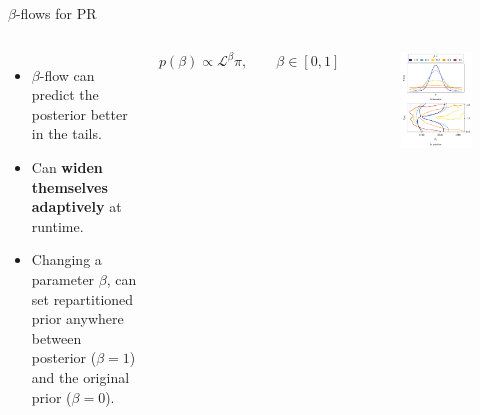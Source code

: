\documentclass[aspectratio=169]{beamer}
\begin{document}
\begin{frame}{$\beta$-flows for PR}
\begin{columns}
    \begin{itemize}
        \item $\beta$-flow can predict the posterior better in the tails.
        \item Can \textbf{widen themselves adaptively} at runtime.
        \item Changing a parameter $\beta$, can set repartitioned prior anywhere between posterior ($\beta=1$) and the original prior ($\beta=0$).
    \end{itemize}\vspace{2em}
    \begin{equation}
        p(\beta) \propto \mathcal{L}^\beta \pi, \hspace{2em} \beta \in [0,1]
    \end{equation}
\begin{figure}
    \centering
    \includegraphics[width=1\textwidth]{Ca_Foscari Beamer/figure3_beta.pdf}
\end{figure}
\end{columns}   
\end{frame}
\end{document}
